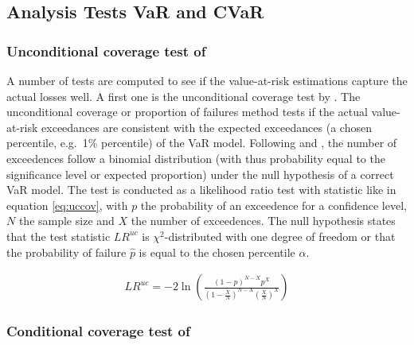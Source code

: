 \documentclass[a4paper, nobind]{templates/ociamthesis}
\begin{document}
\hypertarget{analysis-tests-var-and-cvar}{%
\subsection{Analysis Tests VaR and CVaR}\label{analysis-tests-var-and-cvar}}

\hypertarget{unconditional-coverage-test-of-kupiec1995}{%
\subsubsection{\texorpdfstring{Unconditional coverage test of \textcite{kupiec1995}}{Unconditional coverage test of @kupiec1995}}\label{unconditional-coverage-test-of-kupiec1995}}

\noindent A number of tests are computed to see if the value-at-risk estimations capture the actual losses well. A first one is the unconditional coverage test by \textcite{kupiec1995}. The unconditional coverage or proportion of failures method tests if the actual value-at-risk exceedances are consistent with the expected exceedances (a chosen percentile, e.g.~1\% percentile) of the VaR model. Following \textcite{kupiec1995} and \textcite{ghalanos2020}, the number of exceedences follow a binomial distribution (with thus probability equal to the significance level or expected proportion) under the null hypothesis of a correct VaR model. The test is conducted as a likelihood ratio test with statistic like in equation \eqref{eq:uccov}, with \(p\) the probability of an exceedence for a confidence level, \(N\) the sample size and \(X\) the number of exceedences. The null hypothesis states that the test statistic \(L R^{u c}\) is \(\chi^2\)-distributed with one degree of freedom or that the probability of failure \(\hat p\) is equal to the chosen percentile \(\alpha\).

\begin{align}
L R^{u c}=-2 \ln \left(\frac{(1-p)^{N-X} p^{X}}{\left(1-\frac{X}{N}\right)^{N-X}\left(\frac{X}{N}\right)^{X}}\right)
\label{eq:uccov}
\end{align}

\hypertarget{conditional-coverage-test-of-christoffersen2001}{%
\subsubsection{\texorpdfstring{Conditional coverage test of \textcite{christoffersen2001}}{Conditional coverage test of @christoffersen2001}}\label{conditional-coverage-test-of-christoffersen2001}}
\end{document}
